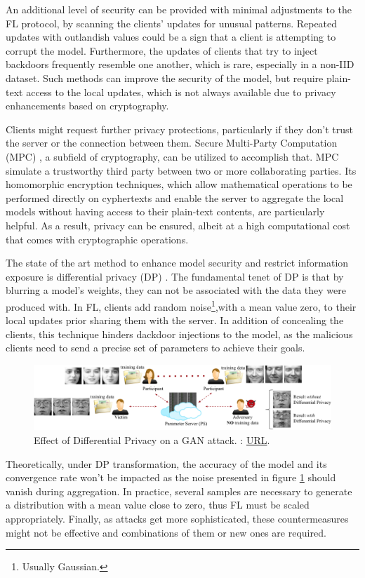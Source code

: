 An additional level of security can be provided with minimal adjustments to the FL protocol, by scanning the clients' updates for unusual patterns. Repeated updates with outlandish values could be a sign that a client is attempting to corrupt the model. Furthermore, the updates of clients that try to inject backdoors frequently resemble one another, which is rare, especially in a non-IID dataset. Such methods can improve the security of the model, but require plain-text access to the local updates, which is not always available due to privacy enhancements based on cryptography.

Clients might request further privacy protections, particularly if they don't trust the server or the connection between them. Secure Multi-Party Computation (MPC) \cite{MPC}, a subfield of cryptography, can be utilized to accomplish that. MPC simulate a trustworthy third party between two or more collaborating parties. Its homomorphic encryption techniques, which allow mathematical operations to be performed directly on cyphertexts and enable the server to aggregate the local models without having access to their plain-text contents, are particularly helpful. As a result, privacy can be ensured, albeit at a high computational cost that comes with cryptographic operations.

The state of the art method to enhance model security and restrict information exposure is differential privacy (DP) \cite{GAN_attack}. The fundamental tenet of DP is that by blurring a model's weights, they can not be associated with the data they were produced with. In FL, clients add random noise\footnote{Usually Gaussian.},with a mean value zero, to their local updates prior sharing them with the server. In addition of concealing the clients, this technique hinders dackdoor injections to the model, as the malicious clients need to send a precise set of parameters to achieve their goals.


\begin{figure}[H]
    \centering
        \includegraphics[width=1\textwidth]{Images/topologies/dp_on_gan_attack.png}
        \decoRule
        \caption[GAN attack under Differential Privacy]{Effect of Differential Privacy on a GAN attack. \cite{GAN_attack}: \href{https://arxiv.org/abs/1702.07464}{URL}.}
        \label{fig:GAN attack under Differential Privacy}
\end{figure}

Theoretically, under DP transformation, the accuracy of the model and its convergence rate won't be impacted as the noise presented in figure \ref{fig:GAN attack under Differential Privacy} should vanish during aggregation. In practice, several samples are necessary to generate a distribution with a mean value close to zero, thus FL must be scaled appropriately. Finally, as attacks get more sophisticated, these countermeasures might not be effective and combinations of them or new ones are required.